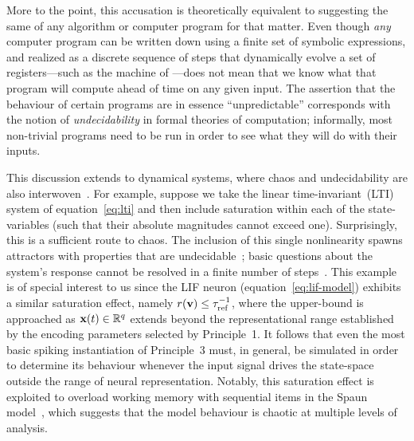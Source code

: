 More to the point, this accusation is theoretically equivalent to suggesting the same of any algorithm or computer program for that matter.
Even though \emph{any} computer program can be written down using a finite set of symbolic expressions, and realized as a discrete sequence of steps that dynamically evolve a set of registers---such as the machine of \citet{turing1938computable}---does not mean that we know what that program will compute ahead of time on any given input.
The assertion that the behaviour of certain programs are in essence ``unpredictable'' corresponds with the notion of \emph{undecidability} in formal theories of computation; informally, most non-trivial programs need to be run in order to see what they will do with their inputs.

This discussion extends to dynamical systems, where chaos and undecidability are also interwoven~\citep{moore1991generalized}.
For example, suppose we take the linear time-invariant~(LTI) system of equation~\ref{eq:lti} and then include saturation within each of the state-variables (such that their absolute magnitudes cannot exceed one).
Surprisingly, this is a sufficient route to chaos.
The inclusion of this single nonlinearity spawns attractors with properties that are undecidable~\citep{blondel2001stability}; basic questions about the system's response cannot be resolved in a finite number of steps~\citep{bennett1990undecidable}.
This example is of special interest to us since the LIF neuron (equation~\ref{eq:lif-model}) exhibits a similar saturation effect, namely $r(\mathbf{v}) \le \tau_\text{ref}^{-1}$, where the upper-bound is approached as $\mathbf{x}(t) \in \mathbb{R}^q$ extends beyond the representational range established by the encoding parameters selected by Principle~1.
It follows that even the most basic spiking instantiation of Principle~3 must, in general, be simulated in order to determine its behaviour whenever the input signal drives the state-space outside the range of neural representation.
Notably, this saturation effect is exploited to overload working memory with sequential items in the Spaun model~\citep{eliasmith2012}, which suggests that the model behaviour is chaotic at multiple levels of analysis.

